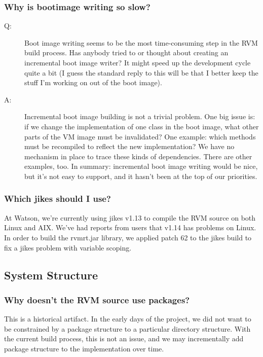 \subsubsection{Why is bootimage writing so slow?} 
\begin{description}
\item [Q:] 
Boot image writing seems to be the most time-consuming step in the
RVM build process.  Has anybody tried to or thought about
creating an incremental boot image writer? It might speed up the
development cycle quite a bit (I guess the standard reply to this will
be that I better keep the stuff I'm working on out of the boot image).

\item [A:]
Incremental boot image building is not a trivial problem.  One big
issue is: if we change the implementation of one class in the boot image,
what other parts of the VM image must be invalidated?  One example: which
methods must be recompiled to reflect the new implementation?  We have no
mechanism in place to trace these kinds of dependencies.  There are other
examples, too.  In summary: incremental boot image writing would be nice,
but it's not easy to support, and it hasn't been at the top of our
priorities.
\end{description}

\subsubsection{Which jikes should I use?}
At Watson, we're currently using jikes v1.13 to compile the RVM source on
both Linux and AIX.  We've had reports from users that v1.14 has problems
on Linux.  In order to build the rvmrt.jar library, we applied patch 62 to
the jikes build to fix a jikes problem with variable scoping.

\subsection{System Structure}

\subsubsection{Why doesn't the RVM source use packages?}

This is a historical artifact.  In the early days of the project, we did
not want to be constrained by a package structure to a particular
directory structure.  With the current build process, this is not an
issue, and we may incrementally add package structure to the
implementation over time.

